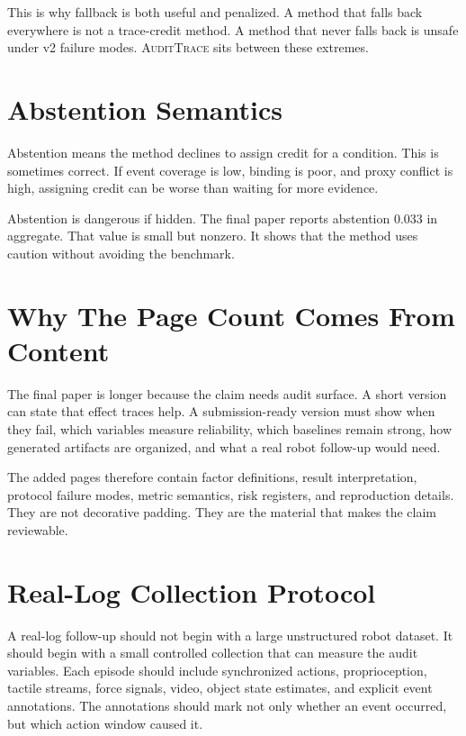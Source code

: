 \documentclass{article}
\newcommand{\method}{\textsc{AuditTrace}\xspace}
\begin{document}
This is why fallback is both useful and penalized. A method that falls back everywhere is not a trace-credit method. A method that never falls back is unsafe under v2 failure modes. \method sits between these extremes.

\section{Abstention Semantics}

Abstention means the method declines to assign credit for a condition. This is sometimes correct. If event coverage is low, binding is poor, and proxy conflict is high, assigning credit can be worse than waiting for more evidence.

Abstention is dangerous if hidden. The final paper reports abstention 0.033 in aggregate. That value is small but nonzero. It shows that the method uses caution without avoiding the benchmark.

\section{Why The Page Count Comes From Content}

The final paper is longer because the claim needs audit surface. A short version can state that effect traces help. A submission-ready version must show when they fail, which variables measure reliability, which baselines remain strong, how generated artifacts are organized, and what a real robot follow-up would need.

The added pages therefore contain factor definitions, result interpretation, protocol failure modes, metric semantics, risk registers, and reproduction details. They are not decorative padding. They are the material that makes the claim reviewable.

\section{Real-Log Collection Protocol}

A real-log follow-up should not begin with a large unstructured robot dataset. It should begin with a small controlled collection that can measure the audit variables. Each episode should include synchronized actions, proprioception, tactile streams, force signals, video, object state estimates, and explicit event annotations. The annotations should mark not only whether an event occurred, but which action window caused it.
\end{document}
